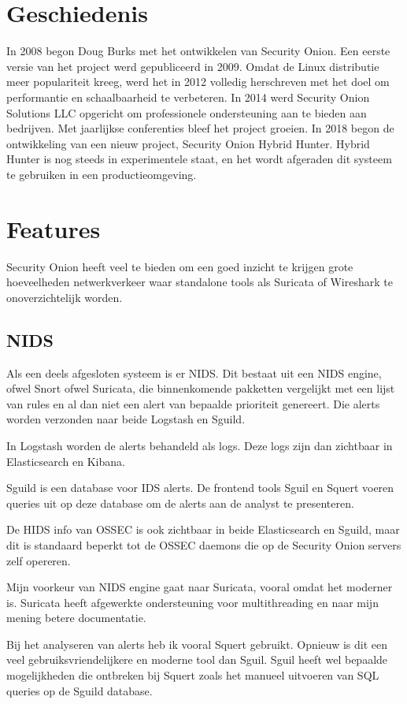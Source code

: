 \documentclass[a4paper,12pt]{report}
\begin{document}
\section{Geschiedenis}
In 2008 begon Doug Burks met het ontwikkelen van Security Onion.
Een eerste versie van het project werd gepubliceerd in 2009.
Omdat de Linux distributie meer populariteit kreeg, werd het in 2012 volledig herschreven met het doel om performantie en schaalbaarheid te verbeteren.
In 2014 werd Security Onion Solutions LLC opgericht om professionele ondersteuning aan te bieden aan bedrijven.
Met jaarlijkse conferenties bleef het project groeien.
\autocite{so:sos}
In 2018 begon de ontwikkeling van een nieuw project, Security Onion Hybrid Hunter.
Hybrid Hunter is nog steeds in experimentele staat, en het wordt afgeraden dit systeem te gebruiken in een productieomgeving.

\section{Features}
Security Onion heeft veel te bieden om een goed inzicht te krijgen grote hoeveelheden netwerkverkeer waar standalone tools als Suricata of Wireshark te onoverzichtelijk worden.

\subsection{NIDS}
Als een deels afgesloten systeem is er NIDS.
Dit bestaat uit een NIDS engine, ofwel Snort ofwel Suricata, die binnenkomende pakketten vergelijkt met een lijst van rules en al dan niet een alert van bepaalde prioriteit genereert.
Die alerts worden verzonden naar beide Logstash en Sguild.

In Logstash worden de alerts behandeld als logs.
Deze logs zijn dan zichtbaar in Elasticsearch en Kibana.

Sguild is een database voor IDS alerts.
De frontend tools Sguil en Squert voeren queries uit op deze database om de alerts aan de analyst te presenteren.

De HIDS info van OSSEC is ook zichtbaar in beide Elasticsearch en Sguild, maar dit is standaard beperkt tot de OSSEC daemons die op de Security Onion servers zelf opereren.

Mijn voorkeur van NIDS engine gaat naar Suricata, vooral omdat het moderner is.
Suricata heeft afgewerkte ondersteuning voor multithreading en naar mijn mening betere documentatie.

Bij het analyseren van alerts heb ik vooral Squert gebruikt.
Opnieuw is dit een veel gebruiksvriendelijkere en moderne tool dan Sguil.
Sguil heeft wel bepaalde mogelijkheden die ontbreken bij Squert zoals het manueel uitvoeren van SQL queries op de Sguild database.
\end{document}
